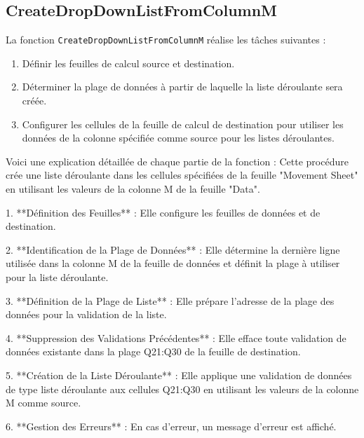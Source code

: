 \documentclass[a4paper, oneside, 12pt, final]{extreport}
\begin{document}
\subsection{CreateDropDownListFromColumnM}
La fonction \texttt{CreateDropDownListFromColumnM} réalise les tâches suivantes :
\begin{enumerate}
    \item Définir les feuilles de calcul source et destination.
    \item Déterminer la plage de données à partir de laquelle la liste déroulante sera créée.
    \item Configurer les cellules de la feuille de calcul de destination pour utiliser les données de la colonne spécifiée comme source pour les listes déroulantes.
\end{enumerate}

Voici une explication détaillée de chaque partie de la fonction :
Cette procédure crée une liste déroulante dans les cellules spécifiées de la feuille "Movement Sheet" en utilisant les valeurs de la colonne M de la feuille "Data".

1. **Définition des Feuilles** : Elle configure les feuilles de données et de destination.

2. **Identification de la Plage de Données** : Elle détermine la dernière ligne utilisée dans la colonne M de la feuille de données et définit la plage à utiliser pour la liste déroulante.

3. **Définition de la Plage de Liste** : Elle prépare l'adresse de la plage des données pour la validation de la liste.

4. **Suppression des Validations Précédentes** : Elle efface toute validation de données existante dans la plage Q21:Q30 de la feuille de destination.

5. **Création de la Liste Déroulante** : Elle applique une validation de données de type liste déroulante aux cellules Q21:Q30 en utilisant les valeurs de la colonne M comme source.

6. **Gestion des Erreurs** : En cas d'erreur, un message d'erreur est affiché.
\end{document}
